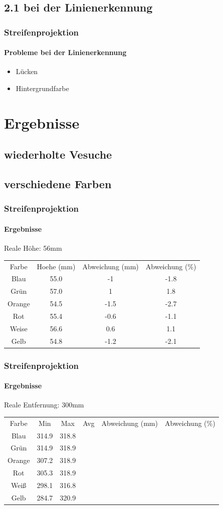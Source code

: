 \documentclass{beamer}
\begin{document}
\subsection{2.1 \hspace{5px} bei der Linienerkennung}
\begin{frame}
	\frametitle{Streifenprojektion}
	\framesubtitle{Probleme bei der Linienerkennung}

	\begin{itemize}
		\item Lücken
		\item Hintergrundfarbe
	\end{itemize}

\end{frame}

\section{Ergebnisse}

\subsection{wiederholte Vesuche}


\subsection{verschiedene Farben}
\begin{frame}
	\frametitle{Streifenprojektion}
	\framesubtitle{Ergebnisse}

	Reale Höhe: 56mm
	\begin{tabular}{c|c|c|c}
		Farbe & Hoehe (mm) & Abweichung (mm) & Abweichung (\%) \\
		Blau & 55.0 & -1 & -1.8\\
		Grün & 57.0 & 1 & 1.8\\
		Orange & 54.5 & -1.5 & -2.7\\
		Rot & 55.4 & -0.6 & -1.1\\
		Weise & 56.6 & 0.6 & 1.1\\
		Gelb & 54.8 & -1.2 & -2.1	
	\end{tabular}

\end{frame}

\begin{frame}
	\frametitle{Streifenprojektion}
	\framesubtitle{Ergebnisse}

	Reale Entfernung: 300mm 
	\begin{tabular}{c|c|c|c|c|c}
		Farbe & Min & Max & Avg & Abweichung (mm) & Abweichung (\%)\\
		Blau & 314.9 & 318.8\\
		Grün & 314.9 & 318.9\\
		Orange & 307.2 & 318.9\\
		Rot & 305.3 & 318.9\\
		Weiß & 298.1 & 316.8\\
		Gelb & 284.7 & 320.9
	\end{tabular}

\end{frame}
\end{document}
